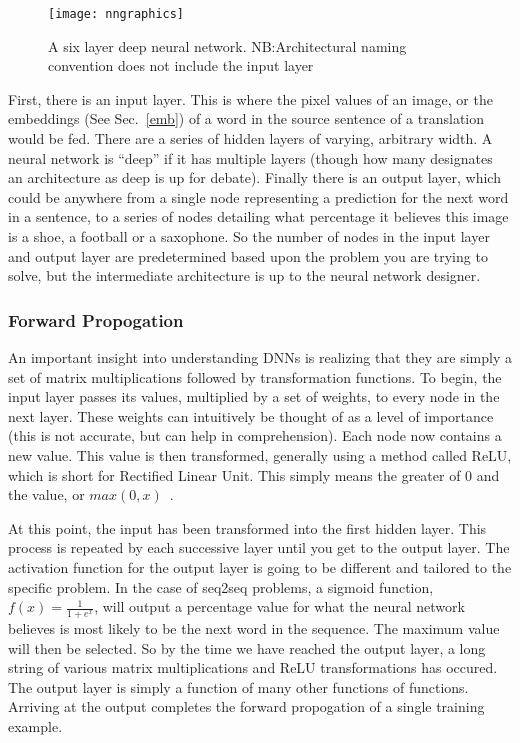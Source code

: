 \begin{figure}[h]
  \centering
  \texttt{[image: nngraphics]}
  \caption[Six layer deep neural network]{A six layer deep neural network. NB:\@ANN Architectural naming convention does not include the input layer~\cite{Stanford2016}}
  \label{fig:NNDiagram}
\end{figure}

First, there is an input layer. This is where the pixel values of an image, or the embeddings (See Sec.~\ref{emb})  of a word in the source sentence of a translation would be fed. There are a series of hidden layers of varying, arbitrary width. A neural network is “deep” if it has multiple layers (though how many designates an architecture as deep is up for debate). Finally there is an output layer, which could be anywhere from a single node representing a prediction for the next word in a sentence, to a series of nodes detailing what percentage it believes this image is a shoe, a football or a saxophone. So the number of nodes in the input layer and output layer are predetermined based upon the problem you are trying to solve, but the intermediate architecture is up to the neural network designer.

\subsubsection{Forward Propogation}
An important insight into understanding DNNs is realizing that they are simply a set of matrix multiplications followed by transformation functions. To begin, the input layer passes its values, multiplied by a set of weights, to every node in the next layer. These weights can intuitively be thought of as a level of importance (this is not accurate, but can help in comprehension). Each node now contains a new value. This value is then transformed, generally using a method called ReLU, which is short for Rectified Linear Unit. This simply means the greater of 0 and the value, or $max(0,x)$~\cite{Nair2010}.

At this point, the input has been transformed into the first hidden layer. This process is repeated by each successive layer until you get to the output layer. The activation function for the output layer is going to be different and tailored to the specific problem. In the case of seq2seq problems, a sigmoid function, $f(x) = \frac{1}{1+e^x}$, will output a percentage value for what the neural network believes is most likely to be the next word in the sequence. The maximum value will then be selected. So by the time we have reached the output layer, a long string of various matrix multiplications and ReLU transformations has occured. The output layer is simply a function of many other functions of functions. Arriving at the output completes the forward propogation of a single training example.

